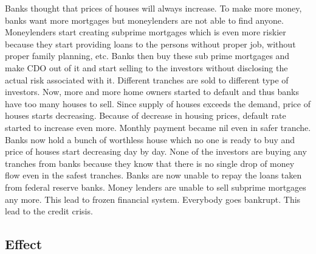 \documentclass[11pt]{article}
\numberwithin{equation}{section}
\begin{document}
\hspace{1cm}Banks thought that prices of houses will always increase. To make more money, banks want more mortgages but moneylenders are not able to find anyone. Moneylenders start creating subprime mortgages which is even more riskier because they start providing loans to the persons without proper job, without proper family planning, etc. Banks then buy these sub prime mortgages and make CDO out of it and start selling to the investors without disclosing the actual risk associated with it. Different tranches are sold to different type of investors. Now, more and more home owners started to default and thus banks have too many houses to sell. Since supply of houses exceeds the demand, price of houses starts decreasing. Because of decrease in housing prices, default rate started to increase even more. Monthly payment became nil even in safer tranche. Banks now hold a bunch of worthless house which no one is ready to buy and price of houses start decreasing day by day. None of the investors are buying any tranches from banks because they know that there is no single drop of money flow even in the safest tranches. Banks are now unable to repay the loans taken from federal reserve banks. Money lenders are unable to sell subprime mortgages any more. This lead to frozen financial system. Everybody goes bankrupt. This lead to the credit crisis.

\subsection{Effect}\medskip
\end{document}
